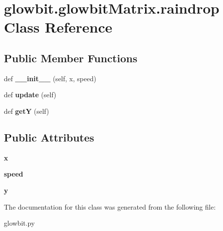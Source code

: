 \hypertarget{classglowbit_1_1glowbitMatrix_1_1raindrop}{}\section{glowbit.\+glowbit\+Matrix.\+raindrop Class Reference}
\label{classglowbit_1_1glowbitMatrix_1_1raindrop}
\subsection*{Public Member Functions}
\begin{DoxyCompactItemize}
\item 
\mbox{\label{classglowbit_1_1glowbitMatrix_1_1raindrop_a5368f364866f8e2bbbb430f7bce8909c}} 
def {\bfseries \+\_\+\+\_\+init\+\_\+\+\_\+} (self, x, speed)
\item 
\mbox{\label{classglowbit_1_1glowbitMatrix_1_1raindrop_aeb03aa245ab1507c74474f6ed7918aa4}} 
def {\bfseries update} (self)
\item 
\mbox{\label{classglowbit_1_1glowbitMatrix_1_1raindrop_a8139214ebb75e44097147c61d254de5f}} 
def {\bfseries getY} (self)
\end{DoxyCompactItemize}
\subsection*{Public Attributes}
\begin{DoxyCompactItemize}
\item 
\mbox{\label{classglowbit_1_1glowbitMatrix_1_1raindrop_a4c481273b383e7ceed52eaa0f39a1a0a}} 
{\bfseries x}
\item 
\mbox{\label{classglowbit_1_1glowbitMatrix_1_1raindrop_ade3f6775e6494d001f52e04ae5626fcb}} 
{\bfseries speed}
\item 
\mbox{\label{classglowbit_1_1glowbitMatrix_1_1raindrop_a59a8135a4a81b2fa5f2cbfb225cf1575}} 
{\bfseries y}
\end{DoxyCompactItemize}


The documentation for this class was generated from the following file\+:\begin{DoxyCompactItemize}
\item 
glowbit.\+py\end{DoxyCompactItemize}
